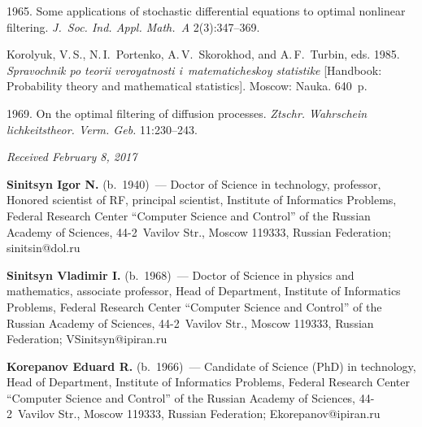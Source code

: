 \begin{multicols}{2}
{{\begin{thebibliography}{99}
 1965.
Some applications of stochastic differential equations to optimal nonlinear filtering.
\textit{J.~Soc. Ind. Appl. Math.~A} 2(3):347--369.

Korolyuk, V.\,S., N.\,I.~Portenko, A.\,V.~Skorokhod, and A.\,F.~Turbin, eds. 1985.
\textit{Spravochnik po teorii veroyatnosti i~matematicheskoy statistike}
[Handbook: Probability theory and mathematical statistics]. Moscow: Nauka.  640~p.

 1969.
On the optimal filtering of diffusion processes. \textit{Ztschr. Wahrschein lichkeitstheor. 
Verm. Geb.} 11:230--243.

\end{thebibliography}

 }
 }

\end{multicols}

\vspace*{-3pt}

\hfill{\small\textit{Received February 8, 2017}}


\Contr

\noindent
\textbf{Sinitsyn Igor N.} (b.\ 1940)~--- 
Doctor of Science in technology, professor, Honored scientist of RF, 
principal scientist, Institute of Informatics Problems, Federal Research Center 
``Computer Science and Control'' of the Russian Academy of Sciences, 
44-2~Vavilov Str., Moscow 119333, Russian Federation; \mbox{sinitsin@dol.ru}

\vspace*{3pt}

\noindent
\textbf{Sinitsyn Vladimir I.} (b.\ 1968)~--- 
Doctor of Science in physics and mathematics, associate professor, 
Head of Department, Institute of Informatics Problems, Federal Research Center 
``Computer Science and Control'' of the Russian Academy of Sciences, 
44-2~Vavilov Str., Moscow 119333, Russian Federation; \mbox{VSinitsyn@ipiran.ru} 

\vspace*{3pt}

\noindent
\textbf{Korepanov Eduard R.} (b.\ 1966)~--- 
Candidate of Science (PhD) in technology, Head of Department, Institute of 
Informatics Problems, Federal Research Center ``Computer Science and Control'' 
of the Russian Academy of Sciences, 44-2~Vavilov Str., Moscow 119333, 
Russian Federation; \mbox{Ekorepanov@ipiran.ru}
\label{end\stat}


\renewcommand{\bibname}{\protect\rm Литература} 